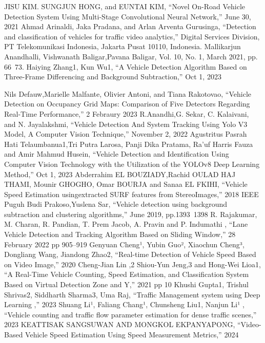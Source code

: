 \documentclass[conference]{IEEEtran}
\begin{document}
\begin{thebibliography}{00}
 JISU KIM. SUNGJUN HONG, and EUNTAI KIM, ``Novel On-Road Vehicle Detection System Using Multi-Stage Convolutional Neural Network,''  June 30, 2021
 Ahmad Arinaldi, Jaka Pradana, and Arlan Arventa Gurusinga, ``Detection and classification of vehicles for traffic video analytics,'' Digital Services Division, PT Telekomunikasi Indonesia, Jakarta Pusat 10110, Indonesia.
 Mallikarjun Anandhalli, Vishwanath Baligar,Pavana Baligar, Vol. 10, No. 1, March 2021, pp. 66~73.
 Haiying Zhang1, Kun Wu1, ``A Vehicle Detection Algorithm Based on Three-Frame Differencing and Background Subtraction,'' Oct 1, 2023 

 Nils Defauw,Marielle Malfante, Olivier Antoni, and Tiana Rakotovao, ``Vehicle Detection on Occupancy Grid Maps: Comparison of Five Detectors Regarding Real-Time Performance,'' 2 Febraury 2023
 R.Anandhi,G. Sekar, C. Kalaivani, and N. Jayalakshmi, ``Vehicle Detection And System Tracking Using Yolo V3
Model, A Computer Vision Technique,'' November 2, 2022
 Agustritus Pasrah Hati Telaumbanua1,Tri Putra Larosa, Panji Dika Pratama, Ra'uf Harris Fauza and Amir Mahmud Husein, ``Vehicle Detection and Identification Using Computer Vision Technology with the Utilization of the YOLOv8 Deep Learning Method,'' Oct 1, 2023
 Abderrahim EL BOUZIADY,Rachid OULAD HAJ THAMI, Mounir GHOGHO, Omar BOURJA and Sanaa EL FKIHI, ``Vehicle Speed Estimation usingextracted SURF features from StereoImages,'' 2018 IEEE
 Puguh Budi Prakoso,Yuslena Sar, ``Vehicle detection using background subtraction and clustering algorithms,''  June 2019, pp.1393~1398
 R. Rajakumar, M. Charan, R. Pandian, T. Prem Jacob, A. Pravin and P. Indumathi , ``Lane Vehicle Detection and Tracking Algorithm Based on Sliding Window,''  28 February 2022 pp 905–919
 Genyuan Cheng¹, Yubin Guo², Xiaochun Cheng³, Dongliang Wang, Jiandong Zhao2, ``Real-time Detection of Vehicle Speed Based on Video Image,'' 2020
 Cheng-Jian Lin ,2 Shiou-Yun Jeng,3 and Hong-Wei Lioa1, ``A Real-Time Vehicle Counting, Speed Estimation, and Classification System Based on Virtual Detection Zone and Y,'' 2021 pp 10
 Khushi Gupta1, Trishul Shrivas2, Siddharth Sharma3, Uma Raj, ``Traffic Management system using Deep Learning ,'' 2023
Shuang Li¹, Faliang Chang¹, Chunsheng Liu1, Nanjun Li¹
, ``Vehicle counting and traffic flow parameter estimation for dense traffic scenes,'' 2023
KEATTISAK SANGSUWAN AND MONGKOL EKPANYAPONG, ``Video-Based Vehicle Speed Estimation Using Speed Measurement Metrics,'' 2024

\end{thebibliography}
\end{document}
